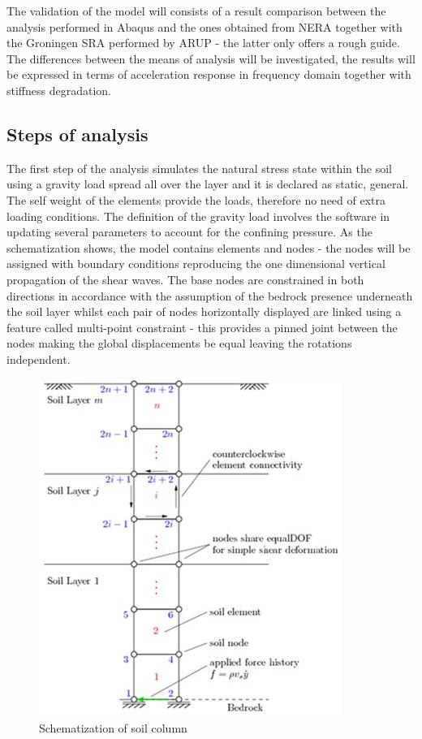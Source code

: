 	The validation of the model will consists of a result comparison between the analysis performed in Abaqus and the ones obtained from NERA together with the Groningen SRA performed by ARUP - the latter only offers a rough guide. The differences between the means of analysis will be investigated, the results will be expressed in terms of acceleration response in frequency domain together with stiffness degradation. 
	
	\subsection{Steps of analysis}
	The first step of the analysis simulates the natural stress state within the soil using a gravity load spread all over the layer and it is declared as static, general. The self weight of the elements provide the loads, therefore no need of extra loading conditions. The definition of the gravity load involves the software in updating several parameters to account for the confining pressure. As the schematization shows, the model contains elements and nodes - the nodes will be assigned with boundary conditions reproducing the one dimensional vertical propagation of the shear waves. The base nodes are constrained in both directions in accordance with the assumption of the bedrock presence underneath the soil layer whilst each pair of nodes horizontally displayed are linked using a feature called multi-point constraint - this provides a pinned joint between the nodes making the global displacements be equal leaving the rotations independent. 
	
	\begin{figure}
		\centering
		\includegraphics[width=0.7\linewidth]{"Soil column"}
		\caption[]{Schematization of soil column}
		\label{Soilcolumn}
	\end{figure}
	
